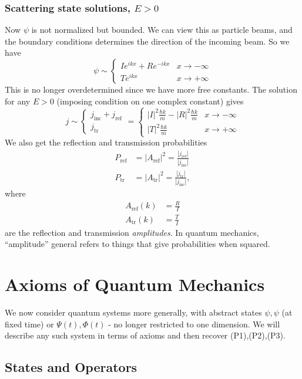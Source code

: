 \documentclass[a4paper]{article}
\begin{document}
\subsubsection*{Scattering state solutions, \texorpdfstring{$E > 0$}{E }}
Now $\psi$ is not normalized but bounded. We can view this as particle beams, and the boundary conditions determines the direction of the incoming beam. So we have
\[
\psi \sim
\begin{cases}
I e^{ikx} + R e^{-ikx} & x \to -\infty\\
Te^{ikx} & x \to +\infty
\end{cases}
\]
This is no longer overdetermined since we have more free constants. The solution for any $E > 0$ (imposing condition on one complex constant) gives
\[
j \sim
\begin{cases}
j_{\mathrm{inc}} + j_{\mathrm{ref}}\\
j_{\mathrm{tr}}
\end{cases}
=
\begin{cases}
|I|^2 \frac{\hbar k}{m} - |R|^2 \frac{\hbar k}{m} & x \to -\infty\\
|T|^2 \frac{\hbar k}{m} & x \to +\infty
\end{cases}
\]
We also get the reflection and transmission probabilities
\begin{align*}
P_{\mathrm{ref}} &= |A_{\mathrm{ref}}|^2 = \frac{|j_{\mathrm{ref}}|}{|j_{\mathrm{inc}}|}\\
P_{\mathrm{tr}} &= |A_{\mathrm{tr}}|^2 = \frac{|j_{\mathrm{tr}}|}{|j_{\mathrm{inc}}|},
\end{align*}
where
\begin{align*}
A_{\mathrm{ref}}(k) &= \frac{R}{I} \\
A_{\mathrm{tr}}(k) &= \frac{T}{I}
\end{align*}
are the reflection and transmission \emph{amplitudes}. In quantum mechanics, ``amplitude'' general refers to things that give probabilities when squared.

\section{Axioms of Quantum Mechanics}

We now consider quantum systems more generally, with abstract states $ \psi, \psi $ (at fixed time) or $ \Psi(t), \Phi(t) $ - no longer restricted to one dimension. We will describe any such system in terms of axioms and then recover (P1),(P2),(P3).

\subsection{States and Operators }
\end{document}
